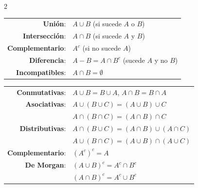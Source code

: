 \documentclass[10pt,a4paper]{article}
\begin{document}
\begin{multicols}{2}
    \begin{tcolorbox}[title=Operaciones, equal height group=SUC2]
        \begin{tabular}{rl}
            \textbf{Unión}: & \(A \cup B\) (si sucede \(A\) o \(B\)) \\
            \textbf{Intersección}: & \(A \cap B\) (si sucede \(A\) y \(B\)) \\
            \textbf{Complementario}: & \(A^c\) (si no sucede \(A\)) \\
            \textbf{Diferencia}: & \(A - B = A \cap B^c\) (sucede \(A\) y no \(B\)) \\
            \textbf{Incompatibles}: & \(A \cap B = \emptyset\)
        \end{tabular}
    \end{tcolorbox}
    \begin{tcolorbox}[title=Propiedades Operaciones, equal height group=SUC2]
        \begin{tabular}{rl}
            \textbf{Conmutativas}: & \(A \cup B = B \cup A\), \(A \cap B = B \cap A\) \\
            \textbf{Asociativas}: & \(A \cup (B \cup C) = (A \cup B) \cup C\) \\
                                  & \(A \cap (B \cap C) = (A \cap B) \cap C\) \\
            \textbf{Distributivas}: & \(A \cap (B \cup C) = (A \cap B) \cup (A \cap C)\) \\
                                    & \(A \cup (B \cap C) = (A \cup B) \cap (A \cup C)\) \\
            \textbf{Complementario}: & \({(A^c)}^c = A\) \\
            \textbf{De Morgan}: & \({(A \cup B)}^c = A^c \cap B^c\) \\
                                & \({(A \cap B)}^c = A^c \cup B^c\)
        \end{tabular}
    \end{tcolorbox}
\end{multicols}

\end{document}
